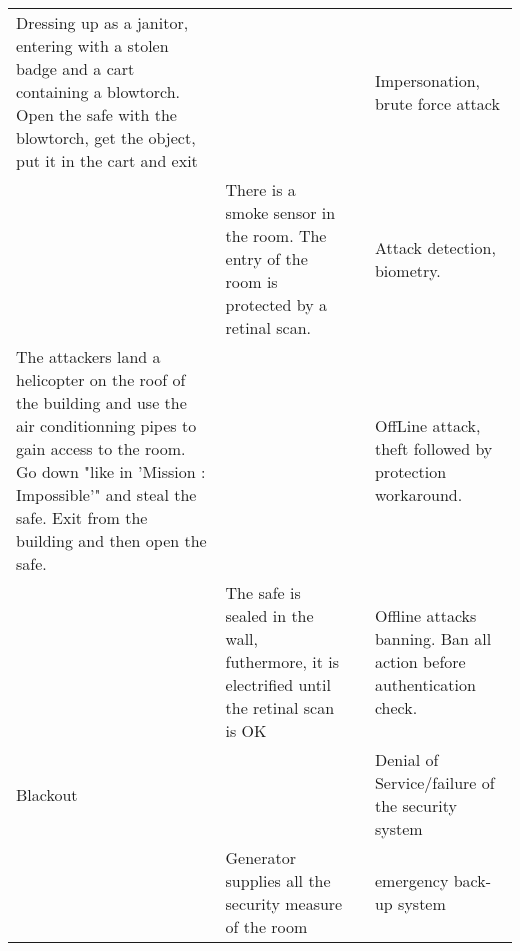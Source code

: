 \documentclass[11pt]{article} %
\begin{document}
\begin{longtable}{|p{3cm}|p{3cm}|p{3cm}|p{3cm}|}
Dressing up as a janitor, entering with a stolen badge and a cart containing a 
blowtorch. Open the safe with the blowtorch, get the object, put it in the cart
and exit & & & Impersonation, brute force attack \\
& There is a smoke sensor in the room. The entry of the room is protected by 
a retinal scan. & & Attack detection, biometry.\\
The attackers land a helicopter on the roof of the building and use the air conditionning 
pipes to gain access to the room. Go down "like in 'Mission : Impossible'" and 
steal the safe. Exit from the building and then open the safe. & & & OffLine
attack, theft followed by protection workaround. \\
& The safe is sealed in the wall, futhermore, it is electrified until the retinal scan
is OK & &  Offline attacks banning. Ban all action before authentication check. \\
Blackout & & & Denial of Service/failure of the security system \\
& Generator supplies all the security measure of the room & & emergency back-up 
system \\

\end{longtable}
\end{document}
